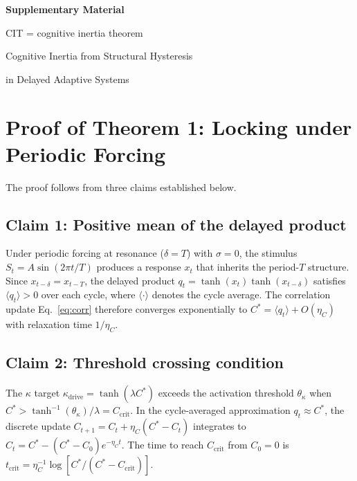 \documentclass[12pt,a4paper]{article}
\begin{document}
\renewcommand{\thesection}{S\arabic{section}}
\newcommand{\thetalock}{\theta_\kappa\xspace}

\renewcommand{\thefigure}{S\arabic{figure}}

\renewcommand{\thetable}{S\arabic{table}}

\renewcommand{\theequation}{S\arabic{equation}}



\centerline{\Large\textbf{Supplementary Material}}\vspace{6pt}

\centerline{CIT = cognitive inertia theorem}

\centerline{Cognitive Inertia from Structural Hysteresis}

\centerline{in Delayed Adaptive Systems}




\section{Proof of Theorem 1: Locking under Periodic Forcing}
\label{sec:proof_locking}

The proof follows from three claims established below.

\subsection{Claim 1: Positive mean of the delayed product}
Under periodic forcing at resonance ($\delta = T$) with $\sigma = 0$, the stimulus $S_t = A\sin(2\pi t/T)$ produces a response $x_t$ that inherits the period-$T$ structure. Since $x_{t-\delta} = x_{t-T}$, the delayed product $q_t = \tanh(x_t)\tanh(x_{t-\delta})$ satisfies $\langle q_t \rangle > 0$ over each cycle, where $\langle\cdot\rangle$ denotes the cycle average. The correlation update Eq.~\eqref{eq:corr} therefore converges exponentially to $C^* = \langle q_t \rangle + O(\eta_C)$ with relaxation time $1/\eta_C$.

\subsection{Claim 2: Threshold crossing condition}
The $\kappa$ target $\kappa_{\mathrm{drive}} = \tanh(\lambda C^*)$ exceeds the activation threshold $\theta_\kappa$ when $C^* > \tanh^{-1}(\theta_\kappa)/\lambda = C_{\mathrm{crit}}$. In the cycle-averaged approximation $q_t \approx C^*$, the discrete update $C_{t+1} = C_t + \eta_C(C^* - C_t)$ integrates to $C_t = C^* - (C^* - C_0)e^{-\eta_C t}$. The time to reach $C_{\mathrm{crit}}$ from $C_0 = 0$ is $t_{\mathrm{crit}} = \eta_C^{-1}\log[C^*/ (C^* - C_{\mathrm{crit}})]$.
\end{document}
